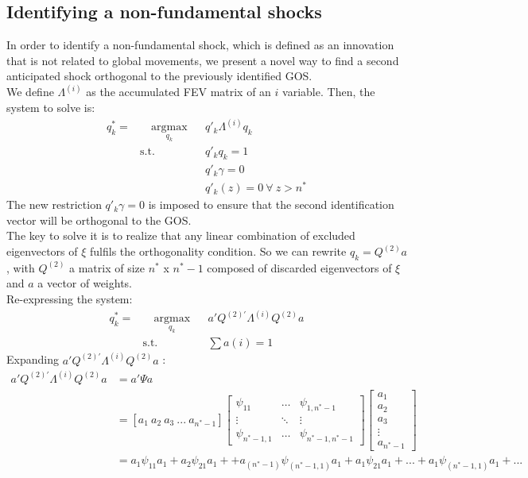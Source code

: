 \documentclass[12pt, a4paper]{article}
\begin{document}
\subsection{Identifying a non-fundamental shocks}
In order to identify a non-fundamental shock, which is defined as an innovation that is not related to global movements, we present a novel way to find a second anticipated shock orthogonal to the previously identified GOS. \\
We define $\Lambda^{(i)}$ as the accumulated FEV matrix of an $i$ variable. Then, the system to solve is:
\begin{equation*}
\begin{aligned}
q^*_k =  & \quad \underset{q_k}{\text{argmax}}
& & q'_k \Lambda^{(i)} q_k \\
& \text{s.t.}
& & q'_k q_k = 1\\
& & & q'_k \gamma = 0 \\
& & & q'_k(z) = 0 \ \forall \ z > n^*
\end{aligned}
\end{equation*}
The new restriction $q'_k \gamma = 0$ is imposed to ensure that the second identification vector will be orthogonal to the GOS. \\ 
The key to solve it is to realize that any linear combination of excluded eigenvectors of $\xi$ fulfils the orthogonality condition. So we can rewrite $q_k = Q^{(2)}a$, with $Q^{(2)}$ a matrix of size $n^*$ x $n^*-1$ composed of discarded eigenvectors of $\xi$ and $a$ a vector of weights. \\
Re-expressing the system:
\begin{equation*}
\begin{aligned}
q^*_k =  & \quad \underset{q_k}{\text{argmax}}
& & a' Q^{(2)'} \Lambda^{(i)} Q^{(2)} a \\
& \text{s.t.}
& & \sum a(i) = 1
\end{aligned}
\end{equation*}
Expanding $ a' Q^{(2)'} \Lambda^{(i)} Q^{(2)} a$ :
\begin{equation*}
\begin{aligned}
a' Q^{(2)'} \Lambda^{(i)} Q^{(2)} a &= a' \Psi a \\
&=  [a_1 \ a_2  \ a_3 \ ... \ a_{n^*-1}] 
\left[\begin{array}{ccc} \psi_{11} & \hdots & \psi_{1,n^*-1}  \\ \vdots & \ddots & \vdots \\ \psi_{n^*-1,1} & \hdots & \psi_{n^*-1,n^*-1} \end{array} \right]
\left[\begin{matrix} a_1 \\ a_2 \\ a_3 \\ \vdots \\ a_{n^*-1} \end{matrix} \right] \\
&=  a_1 \psi_{11} a_1 + a_2 \psi_{21} a_1 + + a_{(n^*-1)} \psi_{(n^*-1,1)} a_1+a_1 \psi_{21} a_1+ ... +a_1 \psi_{(n^*-1,1)} a_1 + ...
\end{aligned}
\end{equation*}
\end{document}

